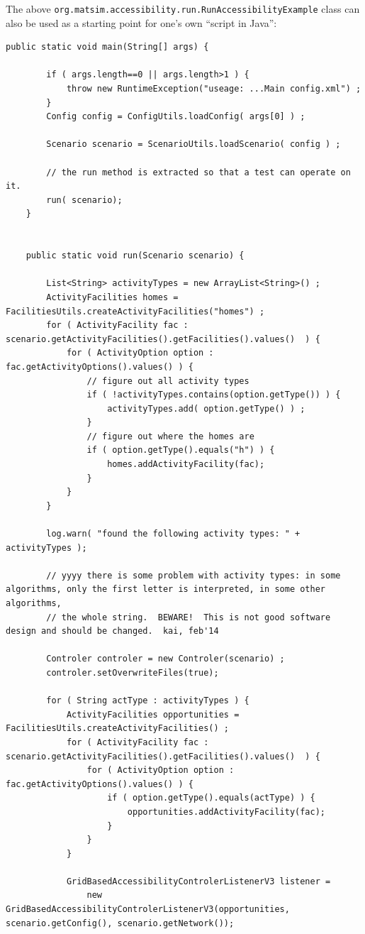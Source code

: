 The above \lstinline$org.matsim.accessibility.run.RunAccessibilityExample$ class can also be used as a starting point for one's own ``script in Java'':
\begin{lstlisting}
public static void main(String[] args) {

		if ( args.length==0 || args.length>1 ) {
			throw new RuntimeException("useage: ...Main config.xml") ;
		}
		Config config = ConfigUtils.loadConfig( args[0] ) ;
		
		Scenario scenario = ScenarioUtils.loadScenario( config ) ;
		
		// the run method is extracted so that a test can operate on it.
		run( scenario);
	}

	
	public static void run(Scenario scenario) {
		
		List<String> activityTypes = new ArrayList<String>() ;
		ActivityFacilities homes = FacilitiesUtils.createActivityFacilities("homes") ;
		for ( ActivityFacility fac : scenario.getActivityFacilities().getFacilities().values()  ) {
			for ( ActivityOption option : fac.getActivityOptions().values() ) {
				// figure out all activity types
				if ( !activityTypes.contains(option.getType()) ) {
					activityTypes.add( option.getType() ) ;
				}
				// figure out where the homes are
				if ( option.getType().equals("h") ) {
					homes.addActivityFacility(fac);
				}
			}
		}
		
		log.warn( "found the following activity types: " + activityTypes ); 
		
		// yyyy there is some problem with activity types: in some algorithms, only the first letter is interpreted, in some other algorithms,
		// the whole string.  BEWARE!  This is not good software design and should be changed.  kai, feb'14
		
		Controler controler = new Controler(scenario) ;
		controler.setOverwriteFiles(true);

		for ( String actType : activityTypes ) {
			ActivityFacilities opportunities = FacilitiesUtils.createActivityFacilities() ;
			for ( ActivityFacility fac : scenario.getActivityFacilities().getFacilities().values()  ) {
				for ( ActivityOption option : fac.getActivityOptions().values() ) {
					if ( option.getType().equals(actType) ) {
						opportunities.addActivityFacility(fac);
					}
				}
			}
			
			GridBasedAccessibilityControlerListenerV3 listener = 
				new GridBasedAccessibilityControlerListenerV3(opportunities, scenario.getConfig(), scenario.getNetwork());


\end{lstlisting}
